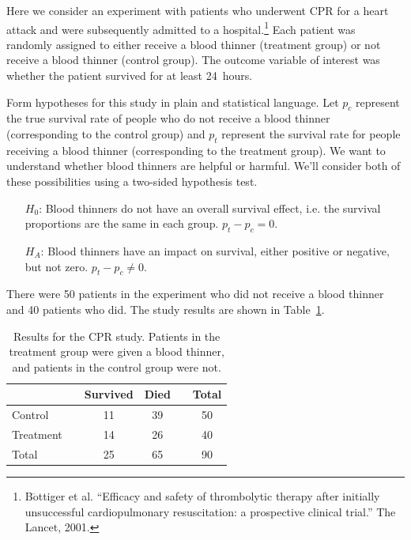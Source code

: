 Here we consider an experiment with patients who underwent CPR for a heart attack and were subsequently admitted to a hospital.\footnote{B$\ddot{\text{o}}$ttiger et al. ``Efficacy and safety of thrombolytic therapy after initially unsuccessful cardiopulmonary resuscitation: a prospective clinical trial.'' The Lancet, 2001.} Each patient was randomly assigned to either receive a blood thinner (treatment group) or not receive a blood thinner (control group). The outcome variable of interest was whether the patient survived for at least 24~hours.

\begin{example}{Form hypotheses for this study in plain and statistical language. Let $p_c$ represent the true survival rate of people who do not receive a blood thinner (corresponding to the control group) and $p_t$ represent the survival rate for people receiving a blood thinner (corresponding to the treatment group).} \label{hypothesesForCPRStudyInSmallSampleSection}
We want to understand whether blood thinners are helpful or harmful. We'll consider both of these possibilities using a two-sided hypothesis test.
\begin{itemize}
\item[$H_0$:] Blood thinners do not have an overall survival effect, i.e. the survival proportions are the same in each group. $p_t - p_c = 0$.
\item[$H_A$:] Blood thinners have an impact on survival, either positive or negative, but not zero. $p_t - p_c \neq 0$.
\end{itemize}
\end{example}

There were 50 patients in the experiment who did not receive a blood thinner and 40 patients who did. The study results are shown in Table~\ref{resultsForCPRStudyInSmallSampleSection}.

\begin{table}[ht]
\centering
\begin{tabular}{lccccc}
\hline
			&& Survived 	& Died 	&& Total \\
\hline
Control		&& 11		& 39		&& 50 \\
Treatment		&& 14		& 26		&& 40 \\
\hline
Total			&& 25		& 65		&& 90 \\
\hline
\end{tabular}
\caption{Results for the CPR study. Patients in the treatment group were given a blood thinner, and patients in the control group were not.}
\label{resultsForCPRStudyInSmallSampleSection}
\end{table}

